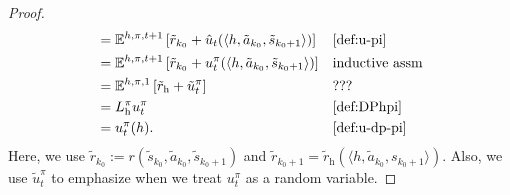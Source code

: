 \begin{proof}
{\begin{align*}
&= \E^{h, \pi, t+1} \left[\tilde{r}_{k_0} +  \hat{u}_t(\langle h,\tilde{a}_{k_0},\tilde{s}_{k_0+1}\rangle) \right] && \text{\cref{def:u-pi}} \\
&= \E^{h, \pi, t+1} \left[\tilde{r}_{k_0} +  u^{\pi}_t(\langle h,\tilde{a}_{k_0},\tilde{s}_{k_0+1}\rangle) \right] && \text{inductive assm} \\
&= \E^{h, \pi, 1} \left[\tilde{r}_{\mathrm{h}} +  \tilde{u}^{\pi}_t \right] && \text{???} \\
&= L_{\mathrm{h}}^{\pi} u_t^{\pi} && \text{\cref{def:DPhpi}} \\
&= u^{\pi}_t(h). && \text{\cref{def:u-dp-pi}}
\end{align*}
}
Here, we use $\tilde{r}_{k_0} := r(\tilde{s}_{k_0}, \tilde{a}_{k_0}, \tilde{s}_{k_0+1})$ and $\tilde{r}_{k_0+1} = \tilde{r}_{\mathrm{h}}(\langle h, \tilde{a}_{k_0}, s_{k_0+1}\rangle)$. Also, we use $\tilde{u}_t^{\pi}$ to emphasize when we treat $u^{\pi}_t$ as a random variable. 

\end{proof}
